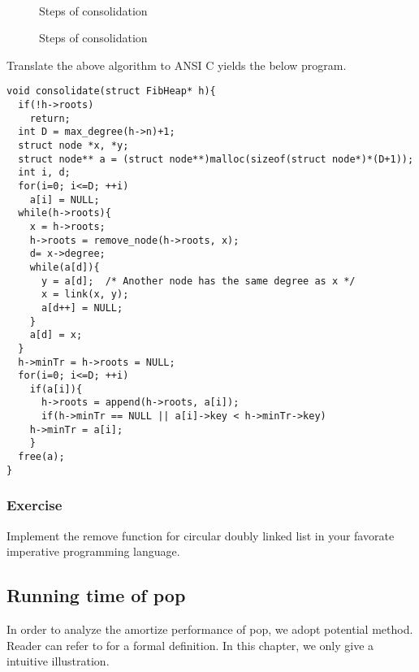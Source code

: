 \documentclass{article}
\begin{document}
\begin{figure}[htbp]
  \centering
   \\
  \caption{Steps of consolidation} \label{fig:fib-cons-b}
\end{figure}

\begin{figure}[htbp]
  \centering
  \caption{Steps of consolidation} \label{fig:fib-cons-c}
\end{figure}


Translate the above algorithm to ANSI C yields the below program.

\lstset{language = C}
\begin{lstlisting}
void consolidate(struct FibHeap* h){
  if(!h->roots)
    return;
  int D = max_degree(h->n)+1;
  struct node *x, *y;
  struct node** a = (struct node**)malloc(sizeof(struct node*)*(D+1));
  int i, d;
  for(i=0; i<=D; ++i)
    a[i] = NULL;
  while(h->roots){
    x = h->roots;
    h->roots = remove_node(h->roots, x);
    d= x->degree;
    while(a[d]){ 
      y = a[d];  /* Another node has the same degree as x */
      x = link(x, y);
      a[d++] = NULL;
    }
    a[d] = x;
  }
  h->minTr = h->roots = NULL;
  for(i=0; i<=D; ++i)
    if(a[i]){
      h->roots = append(h->roots, a[i]);
      if(h->minTr == NULL || a[i]->key < h->minTr->key)
	h->minTr = a[i];
    }
  free(a);
}
\end{lstlisting}

\subsubsection*{Exercise}
Implement the remove function for circular doubly linked list in your favorate
imperative programming language.

\subsection{Running time of pop}

In order to analyze the amortize performance of pop,
we adopt potential method. Reader can refer to \cite{CLRS} for a formal
definition. In this chapter, we only give a intuitive illustration.
\end{document}
